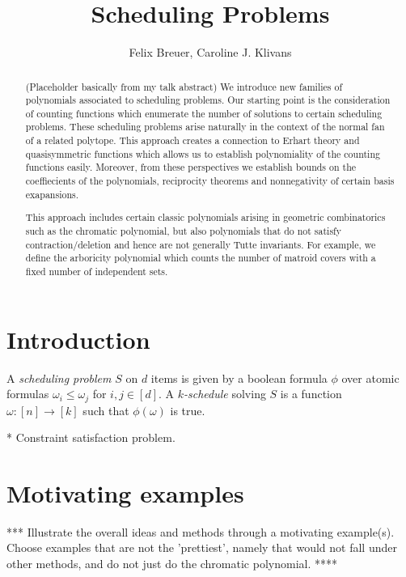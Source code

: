 \documentclass[12pt]{amsart}
\newcommand{\defn}[1]{\emph{#1}}
\begin{document}
\title{Scheduling Problems}
\author{Felix Breuer, Caroline J. Klivans}



\begin{abstract}{(Placeholder basically from my talk abstract) We introduce new families of polynomials associated to scheduling problems.  Our starting point is the consideration of counting functions which enumerate the number of solutions to certain scheduling problems.  These scheduling problems arise naturally in the context of the normal fan of a related polytope.  This approach creates a connection to Erhart theory and quasisymmetric functions which allows us to establish polynomiality of the counting functions easily. Moreover, from these perspectives we establish bounds on the coeffiecients of the polynomials, reciprocity theorems and nonnegativity of certain basis exapansions. 

This approach includes certain classic polynomials arising in geometric combinatorics such as the chromatic polynomial, but also polynomials that do not satisfy contraction/deletion and hence are not generally Tutte invariants.  For example, we define the arboricity polynomial which counts the number of matroid covers with a fixed number of independent sets.}
\end{abstract}
\maketitle


\tableofcontents

\section{Introduction}



A \defn{scheduling problem} $S$ on $d$ items is given by a boolean formula $\phi$ over atomic formulas $\omega_i\leq \omega_j$ for $i,j\in[d]$. A \defn{$k$-schedule} solving $S$ is a function $\omega:[n]\rightarrow[k]$ such that $\phi(\omega)$ is true.

* Constraint satisfaction problem.



\section{Motivating examples}

*** Illustrate the overall ideas and methods through a motivating example(s).  Choose examples that are not the 'prettiest', namely that would not fall under other methods, and do not just do the chromatic polynomial. ****
\end{document}
